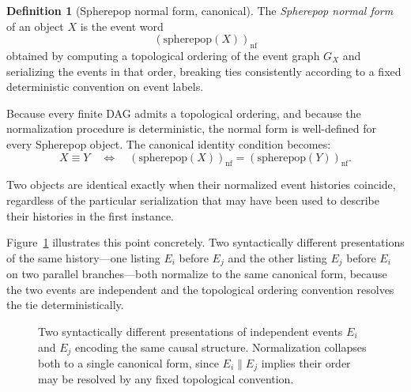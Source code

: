 \documentclass[12pt]{article}
\theoremstyle{plain}
\theoremstyle{definition}
\newtheorem{definition}[theorem]{Definition}
\theoremstyle{remark}
\begin{document}
\begin{definition}[Spherepop normal form, canonical]
The \emph{Spherepop normal form} of an object $X$ is the event word
\[
  (\text{spherepop}(X))_{\mathrm{nf}}
\]
obtained by computing a topological ordering of the event graph $G_X$ and
serializing the events in that order, breaking ties consistently according to
a fixed deterministic convention on event labels.
\end{definition}

Because every finite DAG admits a topological ordering, and because the
normalization procedure is deterministic, the normal form is well-defined for
every Spherepop object.  The canonical identity condition becomes:
\[
  X \equiv Y
  \quad\Longleftrightarrow\quad
  (\text{spherepop}(X))_{\mathrm{nf}} = (\text{spherepop}(Y))_{\mathrm{nf}}.
\]

Two objects are identical exactly when their normalized event histories
coincide, regardless of the particular serialization that may have been used
to describe their histories in the first instance.

Figure~\ref{fig:normalization} illustrates this point concretely.  Two
syntactically different presentations of the same history---one listing $E_i$
before $E_j$ and the other listing $E_j$ before $E_i$ on two parallel
branches---both normalize to the same canonical form, because the two events
are independent and the topological ordering convention resolves the tie
deterministically.

\begin{figure}[ht]
\centering
{}
\caption{Two syntactically different presentations of independent events $E_i$
and $E_j$ encoding the same causal structure.  Normalization collapses both to
a single canonical form, since $E_i \parallel E_j$ implies their order may be
resolved by any fixed topological convention.}
\label{fig:normalization}
\end{figure}
\end{document}
